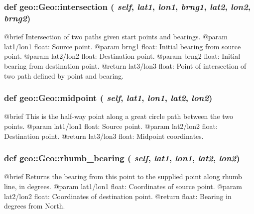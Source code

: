  \hypertarget{classgeo_1_1Geo_a186e47d14da8b081664a5ae701db494c}{
\subsubsection[{intersection}]{\setlength{\rightskip}{0pt plus 5cm}def geo::Geo::intersection ( {\em self}, \/   {\em lat1}, \/   {\em lon1}, \/   {\em brng1}, \/   {\em lat2}, \/   {\em lon2}, \/   {\em brng2})}}
\label{classgeo_1_1Geo_a186e47d14da8b081664a5ae701db494c}
\begin{DoxyVerb}@brief Intersection of two paths given start points and bearings.
    @param {lat1/lon1} float: Source point.
    @param brng1 float: Initial bearing from source point.
    @param {lat2/lon2} float: Destination point.
    @param brng2 float: Initial bearing from destination point.
    @return {lat3/lon3} float: Point of intersection of two path defined by point and bearing.\end{DoxyVerb}
 \hypertarget{classgeo_1_1Geo_a01bb745c04b570ee52b9c464cc5e2f82}{
\subsubsection[{midpoint}]{\setlength{\rightskip}{0pt plus 5cm}def geo::Geo::midpoint ( {\em self}, \/   {\em lat1}, \/   {\em lon1}, \/   {\em lat2}, \/   {\em lon2})}}
\label{classgeo_1_1Geo_a01bb745c04b570ee52b9c464cc5e2f82}
\begin{DoxyVerb}@brief This is the half-way point along a great circle
    path between the two points.
    @param {lat1/lon1} float: Source point.
    @param {lat2/lon2} float: Destination point.
    @return {lat3/lon3} float: Midpoint coordinates.\end{DoxyVerb}
 \hypertarget{classgeo_1_1Geo_a694ce89fb8fc71fa670bf10a7aed202a}{
\subsubsection[{rhumb\_\-bearing}]{\setlength{\rightskip}{0pt plus 5cm}def geo::Geo::rhumb\_\-bearing ( {\em self}, \/   {\em lat1}, \/   {\em lon1}, \/   {\em lat2}, \/   {\em lon2})}}
\label{classgeo_1_1Geo_a694ce89fb8fc71fa670bf10a7aed202a}
\begin{DoxyVerb}@brief Returns the bearing from this point to the supplied point along rhumb line, in degrees.
    @param {lat1/lon1} float: Coordinates of source point.
    @param {lat2/lon2} float: Coordinates of destination point.
    @return float: Bearing in degrees from North.\end{DoxyVerb}
